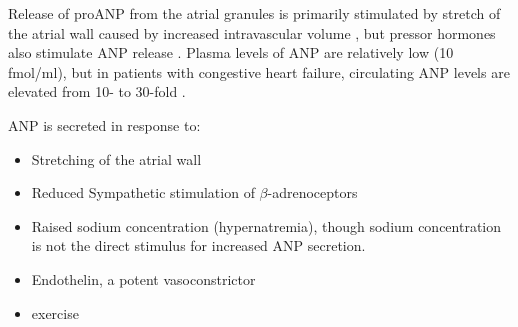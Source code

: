 \documentclass[14pt,a4paper,onecolumn]{extarticle}
\begin{document}
Release of proANP from the atrial granules is primarily stimulated by stretch of the atrial wall caused by increased intravascular volume \citep{Bilder1986} \citep{Edwards1988} \citep{Lang1985}, but pressor hormones also stimulate ANP release \citep{Ruskoaho2003}.
Plasma levels of ANP are relatively low (10 fmol/ml), but in patients with congestive heart failure, circulating ANP levels are elevated from 10- to 30-fold \citep{Burnett1986} \citep{Cody1986}.


ANP is secreted in response to:
    \begin{itemize}
        \item Stretching of the atrial wall \citep{Widmaier2008}
        \item Reduced Sympathetic stimulation of $\beta$-adrenoceptors
        \item Raised sodium concentration (hypernatremia), though sodium concentration is not the direct stimulus for increased ANP secretion. \citep{Widmaier2008}
        \item Endothelin, a potent vasoconstrictor
        \item exercise \citep{Kokkonen2002}
    \end{itemize}
\end{document}
